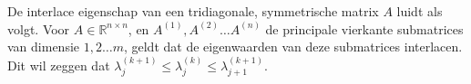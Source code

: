 De interlace eigenschap van een tridiagonale, symmetrische matrix $A$ luidt als volgt. Voor $A \in \mathbb{R}^{n \times n}$, en $A^{(1)}, A^{(2)}  \dots A^{(n)}$ de principale vierkante submatrices van dimensie $1, 2 \dots m$, geldt dat de eigenwaarden van deze submatrices interlacen. Dit wil zeggen dat $\lambda_j^{(k+1)} \leq \lambda_j^{(k)} \leq \lambda_{j+1}^{(k+1)}$.